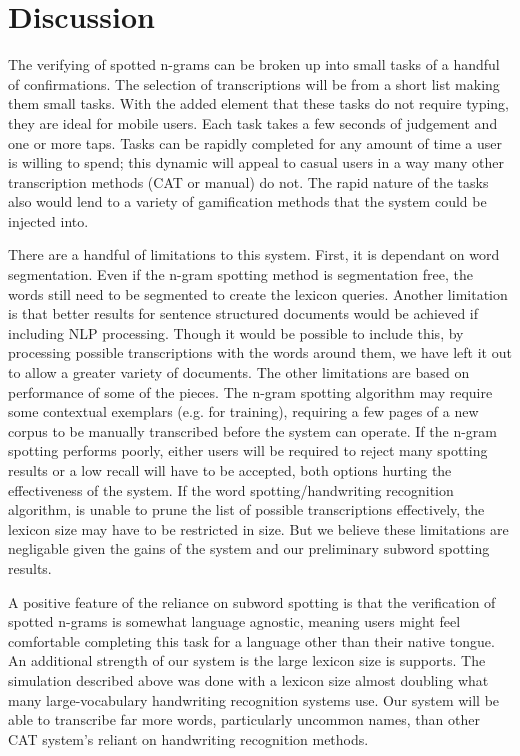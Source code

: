 \documentclass[conference]{IEEEtran}
\begin{document}
\section{Discussion}

The verifying of spotted n-grams can be broken up into small tasks of a handful of confirmations. The selection of transcriptions will be from a short list making them small tasks. With the added element that these tasks do not require typing, they are ideal for mobile users. Each task takes a few seconds of judgement and one or more taps. Tasks can be rapidly completed for any amount of time a user is willing to spend; this dynamic will appeal to casual users in a way many other transcription methods (CAT or manual) do not. The rapid nature of the tasks also would lend to a variety of gamification methods that the system could be injected into. 

There are a handful of limitations to this system. First, it is dependant on word segmentation. Even if the n-gram spotting method is segmentation free, the words still need to be segmented to create the lexicon queries. Another limitation is that better results for sentence structured documents would be achieved if including NLP processing. Though it would be possible to include this, by processing possible transcriptions with the words around them, we have left it out to allow a greater variety of documents. The other limitations are based on performance of some of the pieces. The n-gram spotting algorithm may require some contextual exemplars (e.g. for training), requiring a few pages of a new corpus to be manually transcribed before the system can operate. If the n-gram spotting performs poorly, either users will be required to reject many spotting results or a low recall will have to be accepted, both options hurting the effectiveness of the system. If the word spotting/handwriting recognition algorithm, is unable to prune the list of possible transcriptions effectively, the lexicon size may have to be restricted in size. But we believe these limitations are negligable given the gains of the system and our preliminary subword spotting results.

A positive feature of the reliance on subword spotting is that the verification of spotted n-grams is somewhat language agnostic, meaning users might feel comfortable completing this task for a language other than their native tongue. An additional strength of our system is the large lexicon size is supports. The simulation described above was done with a lexicon size almost doubling what many large-vocabulary handwriting recognition systems use. Our system will be able to transcribe far more words, particularly uncommon names, than other CAT system's reliant on handwriting recognition methods.
\end{document}

